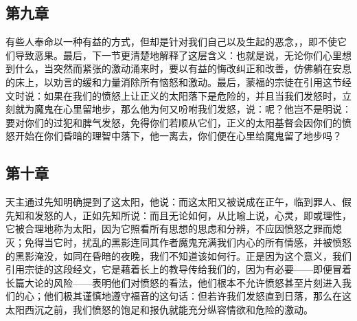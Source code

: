 
\subsection{第九章}

\par

有些人奉命以一种有益的方式，但却是针对我们自己以及生起的恶念，，即不使它们导致恶果。最后，下一节更清楚地解释了这层含义：也就是说，无论你们心里想到什么，当突然而紧张的激动涌来时，要以有益的悔改纠正和改善，仿佛躺在安息的床上，以劝言的缓和力量消除所有恼怒和激动。最后，蒙福的宗徒在引用这节经文时说：如果在我们的愤怒上让正义的太阳落下是危险的，并且当我们发怒时，立刻就为魔鬼在心里留地步，那么他为何又吩咐我们发怒，说：呢？他岂不是明说：要对你们的过犯和脾气发怒，免得你们若顺从它们，正义的太阳基督会因你们的愤怒开始在你们昏暗的理智中落下，他一离去，你们便在心里给魔鬼留了地步吗？\par


\subsection{第十章}

\par

天主通过先知明确提到了这太阳，他说：而这太阳又被说成在正午，临到罪人、假先知和发怒的人，正如先知所说：而且无论如何，从比喻上说，心灵，即或理性，它被合理地称为太阳，因为它照看所有思想的思虑和分辨，不应因愤怒之罪而熄灭；免得当它时，扰乱的黑影连同其作者魔鬼充满我们内心的所有情感，并被愤怒的黑影淹没，如同在昏暗的夜晚，我们不知道该如何行。正是因为这个意义，我们引用宗徒的这段经文，它是藉着长上的教导传给我们的，因为有必要——即便冒着长篇大论的风险——表明他们对愤怒的看法，他们根本不允许愤怒甚至片刻进入我们的心；他们极其谨慎地遵守福音的这句话：但若许我们发怒直到日落，那么在这太阳西沉之前，我们愤怒的饱足和报仇就能充分纵容情欲和危险的激动。\par

